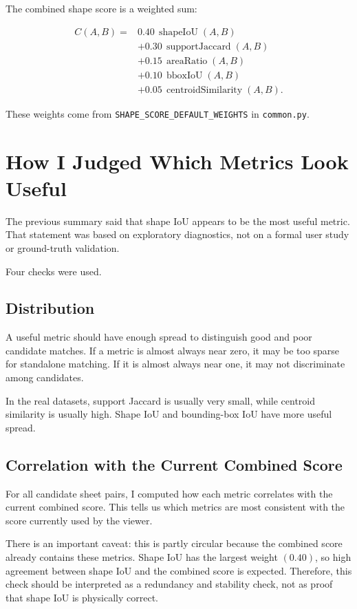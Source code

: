 \documentclass[11pt]{article}
\begin{document}
The combined shape score is a weighted sum:

\[
\begin{aligned}
C(A,B) ={}&
0.40\,\operatorname{shapeIoU}(A,B) \\
&+ 0.30\,\operatorname{supportJaccard}(A,B) \\
&+ 0.15\,\operatorname{areaRatio}(A,B) \\
&+ 0.10\,\operatorname{bboxIoU}(A,B) \\
&+ 0.05\,\operatorname{centroidSimilarity}(A,B).
\end{aligned}
\]

These weights come from \texttt{SHAPE\_SCORE\_DEFAULT\_WEIGHTS} in
\texttt{common.py}.

\section{How I Judged Which Metrics Look Useful}

The previous summary said that shape IoU appears to be the most useful metric.
That statement was based on exploratory diagnostics, not on a formal user
study or ground-truth validation.

Four checks were used.

\subsection{Distribution}

A useful metric should have enough spread to distinguish good and poor
candidate matches. If a metric is almost always near zero, it may be too sparse
for standalone matching. If it is almost always near one, it may not
discriminate among candidates.

In the real datasets, support Jaccard is usually very small, while centroid
similarity is usually high. Shape IoU and bounding-box IoU have more useful
spread.

\subsection{Correlation with the Current Combined Score}

For all candidate sheet pairs, I computed how each metric correlates with the
current combined score. This tells us which metrics are most consistent with
the score currently used by the viewer.

There is an important caveat: this is partly circular because the combined
score already contains these metrics. Shape IoU has the largest weight
\((0.40)\), so high agreement between shape IoU and the combined score is
expected. Therefore, this check should be interpreted as a redundancy and
stability check, not as proof that shape IoU is physically correct.
\end{document}
